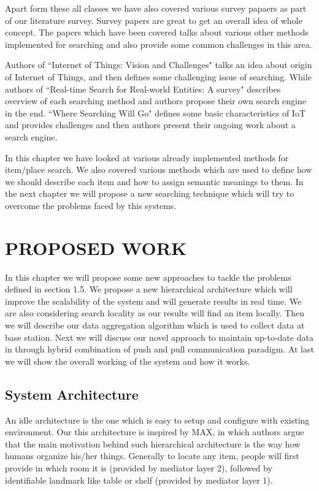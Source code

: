 \documentclass [a4paper,12pt]{book}
\begin{document}
Apart form these all classes we have also covered various survey papaers as part of our literature survey. Survey papers are great to get an overall idea of whole concept. The papers which have been covered talks about various other methods implemented for searching and also provide some common challenges in this area.

Authors of ``Internet of Things: Vision and Challenges" \cite{9} talks an idea about origin of Internet of Things, and then defines some challenging issue of searching. While authors of ``Real-time Search for Real-world Entities: A survey" \cite{16} describes overview of each searching method and authors propose their own search engine in the end. ``Where Searching Will Go" \cite{24} defines some basic characteristics of IoT and provides challenges and then authors present their ongoing work about a search engine.

In this chapter we have looked at various already implemented methods for item/place search. We also covered various methods which are used to define how we should describe each item and how to assign semantic meanings to them. In the next chapter we will propose a new searching technique which will try to overcome the problems faced by this systems.

\newpage
\chapter{PROPOSED WORK}
\vspace{0.2cm}

In this chapter we will propose some new approaches to tackle the problems defined in section 1.5. We propose a new hierarchical architecture which will improve the scalability of the system and will generate results in real time. We are also considering search locality as our results will find an item locally. Then we will describe our data aggregation algorithm which is used to collect data at base station. Next we will discuss our novel approach to maintain up-to-date data in through hybrid combination of push and pull communication paradigm. At last we will show the overall working of the system and how it works.

\section{System Architecture}

An idle architecture is the one which is easy to setup and configure with existing environment. Our this architecture is inspired by MAX\cite{13}, in which authors argue that the main motivation behind such hierarchical architecture is the way how humans organize his/her things. Generally to locate any item, people will first provide in which room it is (provided by mediator layer 2), followed by identifiable landmark like table or shelf (provided by mediator layer 1). 
\end{document}
